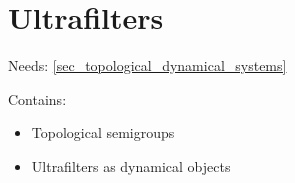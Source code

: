 

    




\section{Ultrafilters}
\label{sec_ultrafilters}

Needs: \cref{sec_topological_dynamical_systems}

Contains:
\begin{itemize}
    \item Topological semigroups

    \item Ultrafilters as dynamical objects
\end{itemize}

